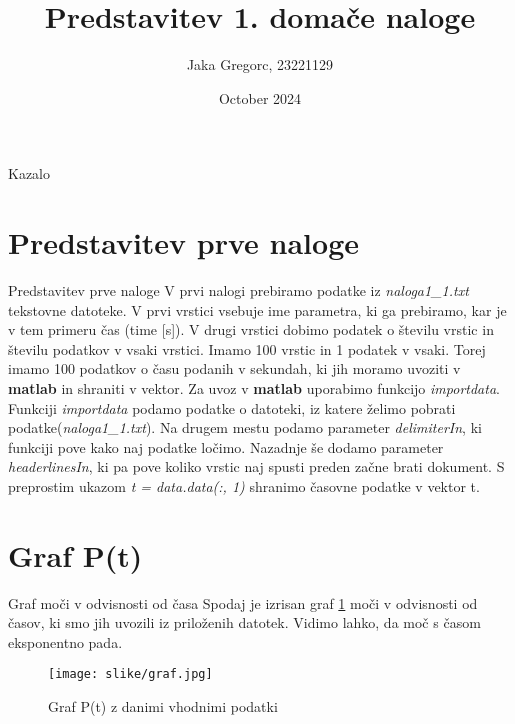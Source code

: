\documentclass[11pt, aspectration=169]{beamer}
\title{Predstavitev 1. domače naloge}
\author{Jaka Gregorc, 23221129}
\date{October 2024}
\begin{document}
\maketitle

\begin{frame}{Kazalo}
\tableofcontents
\end{frame}

\section{Predstavitev prve naloge}
\begin{frame}{Predstavitev prve naloge}
\justifying
V prvi nalogi prebiramo podatke iz \textit{naloga1\_1.txt} tekstovne datoteke. V prvi vrstici vsebuje ime parametra, ki ga prebiramo, kar je v tem primeru čas (time [s]). V drugi vrstici dobimo podatek o številu vrstic in številu podatkov v vsaki vrstici. Imamo 100 vrstic in 1 podatek v vsaki. Torej imamo 100 podatkov o času podanih v sekundah, ki jih moramo uvoziti v \textbf{matlab} in shraniti v vektor. Za uvoz v \textbf{matlab} uporabimo funkcijo \textit{importdata}. Funkciji \textit{importdata} podamo podatke o datoteki, iz katere želimo pobrati podatke(\textit{naloga1\_1.txt}). Na drugem mestu podamo parameter \textit{delimiterIn}, ki funkciji pove kako naj podatke ločimo. Nazadnje še dodamo parameter \textit{headerlinesIn}, ki pa pove koliko vrstic naj spusti preden začne brati dokument. S preprostim ukazom \textit{t = data.data(:, 1)} shranimo časovne podatke v vektor t.
\end{frame}

\section{Graf P(t)}
\begin{frame}{Graf moči v odvisnosti od časa}
Spodaj je izrisan graf \ref{fig:Graf P(t)} moči v odvisnosti od časov, ki smo jih uvozili iz priloženih datotek. Vidimo lahko, da moč s časom eksponentno pada.
\begin{figure}
    \centering
    \texttt{[image: slike/graf.jpg]}
    \caption{Graf P(t) z danimi vhodnimi podatki}
    \label{fig:Graf P(t)}
\end{figure}
    
\end{frame}
\end{document}
